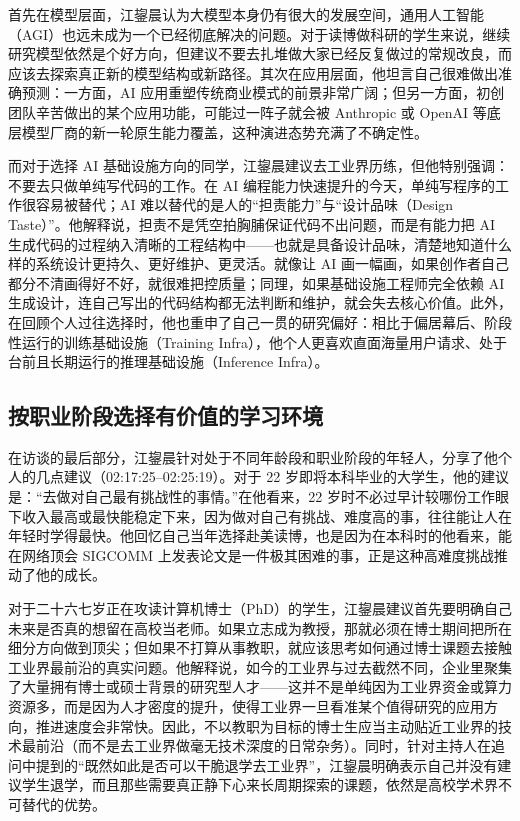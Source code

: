 \documentclass[UTF8,a4paper,11pt,fontset=fandol]{ctexart}
\begin{document}
首先在模型层面，江鋆晨认为大模型本身仍有很大的发展空间，通用人工智能（AGI）也远未成为一个已经彻底解决的问题。对于读博做科研的学生来说，继续研究模型依然是个好方向，但建议不要去扎堆做大家已经反复做过的常规改良，而应该去探索真正新的模型结构或新路径。其次在应用层面，他坦言自己很难做出准确预测：一方面，AI 应用重塑传统商业模式的前景非常广阔；但另一方面，初创团队辛苦做出的某个应用功能，可能过一阵子就会被 Anthropic 或 OpenAI 等底层模型厂商的新一轮原生能力覆盖，这种演进态势充满了不确定性。

而对于选择 AI 基础设施方向的同学，江鋆晨建议去工业界历练，但他特别强调：不要去只做单纯写代码的工作。在 AI 编程能力快速提升的今天，单纯写程序的工作很容易被替代；AI 难以替代的是人的“担责能力”与“设计品味（Design Taste）”。他解释说，担责不是凭空拍胸脯保证代码不出问题，而是有能力把 AI 生成代码的过程纳入清晰的工程结构中——也就是具备设计品味，清楚地知道什么样的系统设计更持久、更好维护、更灵活。就像让 AI 画一幅画，如果创作者自己都分不清画得好不好，就很难把控质量；同理，如果基础设施工程师完全依赖 AI 生成设计，连自己写出的代码结构都无法判断和维护，就会失去核心价值。此外，在回顾个人过往选择时，他也重申了自己一贯的研究偏好：相比于偏居幕后、阶段性运行的训练基础设施（Training Infra），他个人更喜欢直面海量用户请求、处于台前且长期运行的推理基础设施（Inference Infra）。

\subsection{按职业阶段选择有价值的学习环境}
在访谈的最后部分，江鋆晨针对处于不同年龄段和职业阶段的年轻人，分享了他个人的几点建议（02:17:25–02:25:19）。对于 22 岁即将本科毕业的大学生，他的建议是：“去做对自己最有挑战性的事情。”在他看来，22 岁时不必过早计较哪份工作眼下收入最高或最快能稳定下来，因为做对自己有挑战、难度高的事，往往能让人在年轻时学得最快。他回忆自己当年选择赴美读博，也是因为在本科时的他看来，能在网络顶会 SIGCOMM 上发表论文是一件极其困难的事，正是这种高难度挑战推动了他的成长。

对于二十六七岁正在攻读计算机博士（PhD）的学生，江鋆晨建议首先要明确自己未来是否真的想留在高校当老师。如果立志成为教授，那就必须在博士期间把所在细分方向做到顶尖；但如果不打算从事教职，就应该思考如何通过博士课题去接触工业界最前沿的真实问题。他解释说，如今的工业界与过去截然不同，企业里聚集了大量拥有博士或硕士背景的研究型人才——这并不是单纯因为工业界资金或算力资源多，而是因为人才密度的提升，使得工业界一旦看准某个值得研究的应用方向，推进速度会非常快。因此，不以教职为目标的博士生应当主动贴近工业界的技术最前沿（而不是去工业界做毫无技术深度的日常杂务）。同时，针对主持人在追问中提到的“既然如此是否可以干脆退学去工业界”，江鋆晨明确表示自己并没有建议学生退学，而且那些需要真正静下心来长周期探索的课题，依然是高校学术界不可替代的优势。
\end{document}
